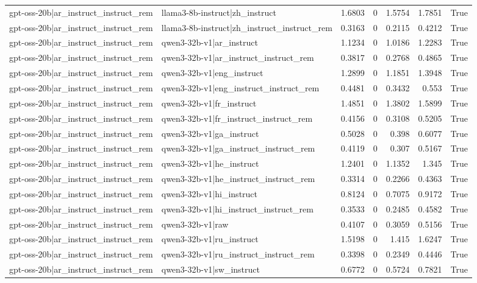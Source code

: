 \begin{table}
\begin{tabular}{l l r r r r l}
gpt-oss-20b|ar_instruct_instruct_rem & llama3-8b-instruct|zh_instruct & 1.6803 & 0 & 1.5754 & 1.7851 & True \\
gpt-oss-20b|ar_instruct_instruct_rem & llama3-8b-instruct|zh_instruct_instruct_rem & 0.3163 & 0 & 0.2115 & 0.4212 & True \\
gpt-oss-20b|ar_instruct_instruct_rem & qwen3-32b-v1|ar_instruct & 1.1234 & 0 & 1.0186 & 1.2283 & True \\
gpt-oss-20b|ar_instruct_instruct_rem & qwen3-32b-v1|ar_instruct_instruct_rem & 0.3817 & 0 & 0.2768 & 0.4865 & True \\
gpt-oss-20b|ar_instruct_instruct_rem & qwen3-32b-v1|eng_instruct & 1.2899 & 0 & 1.1851 & 1.3948 & True \\
gpt-oss-20b|ar_instruct_instruct_rem & qwen3-32b-v1|eng_instruct_instruct_rem & 0.4481 & 0 & 0.3432 & 0.553 & True \\
gpt-oss-20b|ar_instruct_instruct_rem & qwen3-32b-v1|fr_instruct & 1.4851 & 0 & 1.3802 & 1.5899 & True \\
gpt-oss-20b|ar_instruct_instruct_rem & qwen3-32b-v1|fr_instruct_instruct_rem & 0.4156 & 0 & 0.3108 & 0.5205 & True \\
gpt-oss-20b|ar_instruct_instruct_rem & qwen3-32b-v1|ga_instruct & 0.5028 & 0 & 0.398 & 0.6077 & True \\
gpt-oss-20b|ar_instruct_instruct_rem & qwen3-32b-v1|ga_instruct_instruct_rem & 0.4119 & 0 & 0.307 & 0.5167 & True \\
gpt-oss-20b|ar_instruct_instruct_rem & qwen3-32b-v1|he_instruct & 1.2401 & 0 & 1.1352 & 1.345 & True \\
gpt-oss-20b|ar_instruct_instruct_rem & qwen3-32b-v1|he_instruct_instruct_rem & 0.3314 & 0 & 0.2266 & 0.4363 & True \\
gpt-oss-20b|ar_instruct_instruct_rem & qwen3-32b-v1|hi_instruct & 0.8124 & 0 & 0.7075 & 0.9172 & True \\
gpt-oss-20b|ar_instruct_instruct_rem & qwen3-32b-v1|hi_instruct_instruct_rem & 0.3533 & 0 & 0.2485 & 0.4582 & True \\
gpt-oss-20b|ar_instruct_instruct_rem & qwen3-32b-v1|raw & 0.4107 & 0 & 0.3059 & 0.5156 & True \\
gpt-oss-20b|ar_instruct_instruct_rem & qwen3-32b-v1|ru_instruct & 1.5198 & 0 & 1.415 & 1.6247 & True \\
gpt-oss-20b|ar_instruct_instruct_rem & qwen3-32b-v1|ru_instruct_instruct_rem & 0.3398 & 0 & 0.2349 & 0.4446 & True \\
gpt-oss-20b|ar_instruct_instruct_rem & qwen3-32b-v1|sw_instruct & 0.6772 & 0 & 0.5724 & 0.7821 & True \\

\end{tabular}
\end{table}
